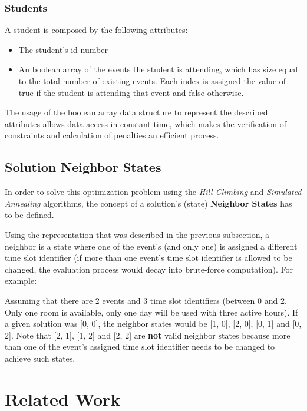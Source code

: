 \documentclass[conference]{IEEEtran}
\begin{document}
\subsubsection{Students}

A student is composed by the following attributes:
\begin{itemize}
    \item The student's id number
    \item An boolean array of the events the student is attending, which has size equal to the total number of existing events. Each index is assigned the value of true if the student is attending that event and false otherwise.
\end{itemize}

The usage of the boolean array data structure to represent the described attributes allows data access in constant time, which makes the verification of constraints and calculation of penalties an efficient process.

\subsection{Solution Neighbor States} \label{subsec:sns}

In order to solve this optimization problem using the \textit{Hill Climbing} and \textit{Simulated Annealing} algorithms, the concept of a solution's (state) \textbf{Neighbor States} has to be defined.

Using the representation that was described in the previous subsection, a neighbor is a state where one of the event's (and only one) is assigned a different time slot identifier (if more than one event's time slot identifier is allowed to be changed, the evaluation process would decay into brute-force computation). For example:

Assuming that there are 2 events and 3 time slot identifiers (between 0 and 2. Only one room is available, only one day will be used with three active hours). If a given solution was [0, 0], the neighbor states would be [1, 0], [2, 0], [0, 1] and [0, 2]. Note that [2, 1], [1, 2] and [2, 2] are \textbf{not} valid neighbor states because more than one of the event's assigned time slot identifier needs to be changed to achieve such states.

\section{Related Work}
\end{document}
